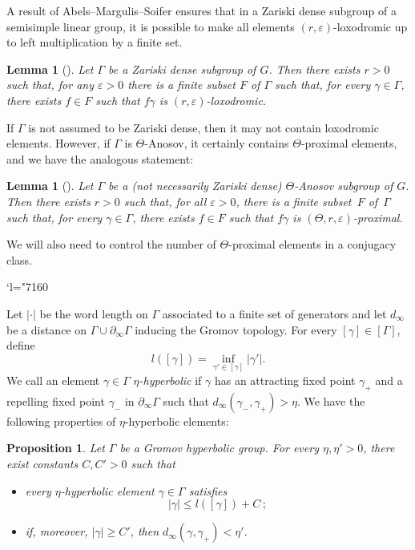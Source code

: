 \documentclass[11pt]{article}
\numberwithin{equation}{section}
\newcommand{\Changel}{\mathcode`l="7160}
\newtheorem{lemma}[theo]{Lemma}
\newtheorem{prop}[theo]{Proposition}
\theoremstyle{definition}
\let\epsilon\varepsilon
\let\G\Gamma
\begin{document}
A result of Abels--Margulis--Soifer ensures that in a Zariski dense subgroup of a semisimple linear group, it is possible to make all elements $(r,\epsilon)$-loxodromic up to left multiplication by a finite set.
\begin{lemma}[{\cite[Th.\,6.8]{abels1995semigroups}}]\label{lem-AMS}
Let $\Gamma$ be a Zariski dense subgroup of $G$. Then there exists $r>0$ such that, for any $\epsilon>0$ there is a finite subset $F$ of $\Gamma$ such that, for every $\gamma \in \Gamma$, there exists $f\in F$ such that $f\gamma$ is $(r,\epsilon)$-loxodromic.
\end{lemma}

If $\Gamma$ is not assumed to be Zariski dense, then it may not contain loxodromic elements. However, if $\Gamma$ is $\Theta$-Anosov, it certainly contains $\Theta$-proximal elements, and we have the analogous statement:

\begin{lemma}[{\cite[Th.\,5.9]{guichard2012anosov}}]\label{lem-AMS guichard wienhard}
Let $\Gamma$ be a (not necessarily Zariski dense) $\Theta$-Anosov subgroup of $G$. Then there exists $r>0$ such that, for all $\epsilon>0$, there is a finite subset~$F$ of~$\Gamma$ such that, for every $\gamma \in \Gamma$, there exists $f\in F$ such that $f\gamma$ is $(\Theta,r,\epsilon)$-proximal.
\end{lemma}

We will also need to control the number of $\Theta$-proximal elements in a conjugacy class.

\Changel

Let $\vert \cdot \vert$ be the word length on $\Gamma$ associated to a finite set of generators and let $d_\infty$ be a distance on $\Gamma \cup \partial_\infty \Gamma$ inducing the Gromov topology. For every $[\gamma] \in [\Gamma]$, define
\[l([\gamma]) = \inf_{\gamma'\in [\gamma]} \vert \gamma'\vert.\]
We call an element $\gamma \in \Gamma$ \emph{$\eta$-hyperbolic} if $\gamma$ has an attracting fixed point $\gamma_+$ and a repelling fixed point $\gamma_-$ in $\partial_\infty \Gamma$ such that $d_\infty (\gamma_-,\gamma_+) >\eta$. We have the following properties of $\eta$-hyperbolic elements:

\begin{prop} \label{prop-Properties hyperbolic elements}
Let $\G$ be a Gromov hyperbolic group. For every $\eta, \eta'>0$, there exist constants $C,C'>0$ such that
\begin{itemize}
\item every $\eta$-hyperbolic element $\gamma \in \Gamma$ satisfies
\[\vert \gamma \vert \leq l([\gamma]) + C\,;\]
\item if, moreover, $\vert \gamma \vert \geq C'$, then $d_\infty(\gamma, \gamma_+) <\eta'$.
\end{itemize}
\end{prop}
\end{document}
